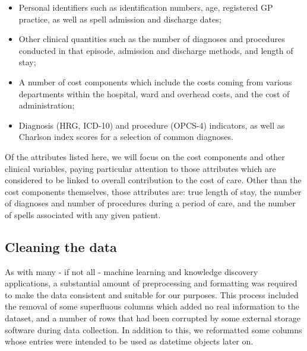 \begin{itemize}
    \item Personal identifiers such as identification numbers, age, registered
        GP practice, as well as spell admission and discharge dates;
    \item Other clinical quantities such as the number of diagnoses and
        procedures conducted in that episode, admission and discharge methods,
        and length of stay;
    \item A number of cost components which include the costs coming from
        various departments within the hospital, ward and overhead costs, and
        the cost of administration;
    \item Diagnosis (HRG, ICD-10) and procedure (OPCS-4) indicators, as well as
        Charlson index scores for a selection of common diagnoses.
\end{itemize}

Of the attributes listed here, we will focus on the cost components and other
clinical variables, paying particular attention to those attributes which are
considered to be linked to overall contribution to the cost of care. Other than
the cost components themselves, those attributes are: true length of stay,
the number of diagnoses and number of procedures during a period of care, and
the number of spells associated with any given patient.

\subsection{Cleaning the data}\label{subsec:formatting}

As with many \-- if not all \-- machine learning and knowledge discovery
applications, a substantial amount of preprocessing and formatting was required
to make the data consistent and suitable for our purposes. This process included
the removal of some superfluous columns which added no real information to the
dataset, and a number of rows that had been corrupted by some external storage
software during data collection. In addition to this, we reformatted some
columns whose entries were intended to be used as datetime objects later on.